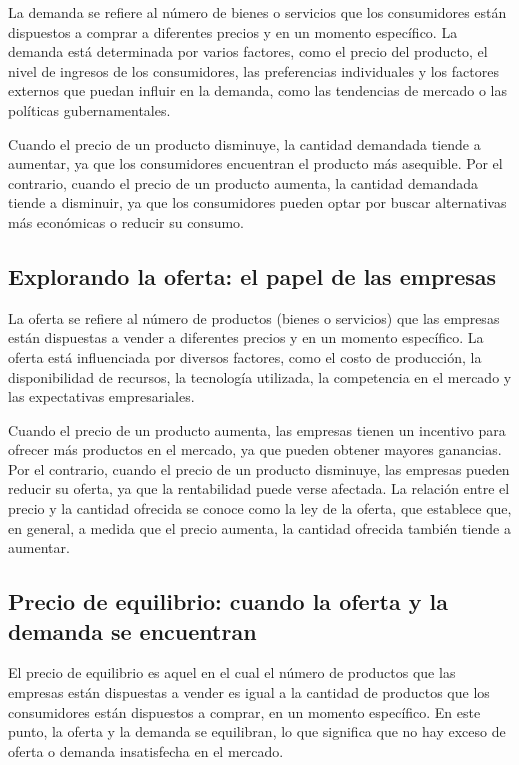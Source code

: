 \documentclass[
  man,
  floatsintext,
  longtable,
  a4paper,
  nolmodern,
  notxfonts,
  notimes,
  colorlinks=true,linkcolor=blue,citecolor=blue,urlcolor=blue]{apa7}
\begin{document}
La demanda se refiere al número de bienes o servicios que los
consumidores están dispuestos a comprar a diferentes precios y en un
momento específico. La demanda está determinada por varios factores,
como el precio del producto, el nivel de ingresos de los consumidores,
las preferencias individuales y los factores externos que puedan influir
en la demanda, como las tendencias de mercado o las políticas
gubernamentales.

Cuando el precio de un producto disminuye, la cantidad demandada tiende
a aumentar, ya que los consumidores encuentran el producto más
asequible. Por el contrario, cuando el precio de un producto aumenta, la
cantidad demandada tiende a disminuir, ya que los consumidores pueden
optar por buscar alternativas más económicas o reducir su consumo.

\subsection{Explorando la oferta: el papel de las
empresas}\label{explorando-la-oferta-el-papel-de-las-empresas}

La oferta se refiere al número de productos (bienes o servicios) que las
empresas están dispuestas a vender a diferentes precios y en un momento
específico. La oferta está influenciada por diversos factores, como el
costo de producción, la disponibilidad de recursos, la tecnología
utilizada, la competencia en el mercado y las expectativas
empresariales.

Cuando el precio de un producto aumenta, las empresas tienen un
incentivo para ofrecer más productos en el mercado, ya que pueden
obtener mayores ganancias. Por el contrario, cuando el precio de un
producto disminuye, las empresas pueden reducir su oferta, ya que la
rentabilidad puede verse afectada. La relación entre el precio y la
cantidad ofrecida se conoce como la ley de la oferta, que establece que,
en general, a medida que el precio aumenta, la cantidad ofrecida también
tiende a aumentar.

\subsection{Precio de equilibrio: cuando la oferta y la demanda se
encuentran}\label{precio-de-equilibrio-cuando-la-oferta-y-la-demanda-se-encuentran}

El precio de equilibrio es aquel en el cual el número de productos que
las empresas están dispuestas a vender es igual a la cantidad de
productos que los consumidores están dispuestos a comprar, en un momento
específico. En este punto, la oferta y la demanda se equilibran, lo que
significa que no hay exceso de oferta o demanda insatisfecha en el
mercado.
\end{document}
